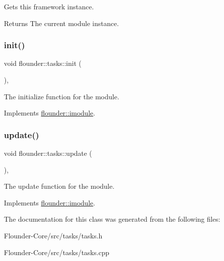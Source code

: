Gets this framework instance. 

\begin{DoxyReturn}{Returns}
The current module instance. 
\end{DoxyReturn}
\mbox{\label{classflounder_1_1tasks_a1527c16072936c764b990d3b9fd8786e}} 
\subsubsection{\texorpdfstring{init()}{init()}}
{\footnotesize\ttfamily void flounder\+::tasks\+::init (\begin{DoxyParamCaption}{ }\end{DoxyParamCaption})\hspace{0.3cm}{\ttfamily [override]}, {\ttfamily [virtual]}}



The initialize function for the module. 



Implements \hyperlink{classflounder_1_1imodule_a1725ef346952884d0741de61aba1e0c7}{flounder\+::imodule}.

\mbox{\label{classflounder_1_1tasks_a32e51c65b63e8c98097d5d40c1912e5c}} 
\subsubsection{\texorpdfstring{update()}{update()}}
{\footnotesize\ttfamily void flounder\+::tasks\+::update (\begin{DoxyParamCaption}{ }\end{DoxyParamCaption})\hspace{0.3cm}{\ttfamily [override]}, {\ttfamily [virtual]}}



The update function for the module. 



Implements \hyperlink{classflounder_1_1imodule_a9a53d48a46b5f6b16a92b2cd8503f74a}{flounder\+::imodule}.



The documentation for this class was generated from the following files\+:\begin{DoxyCompactItemize}
\item 
Flounder-\/\+Core/src/tasks/tasks.\+h\item 
Flounder-\/\+Core/src/tasks/tasks.\+cpp\end{DoxyCompactItemize}
